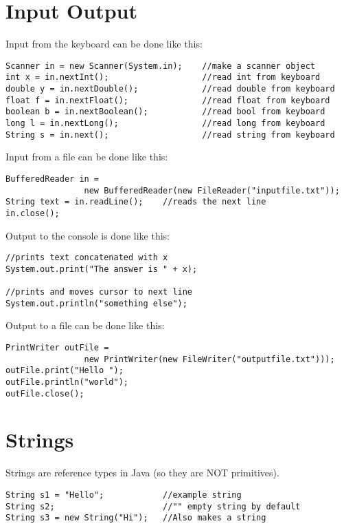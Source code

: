 \documentclass[paper=a4, fontsize=11pt, parskip=full]{scrartcl} %
\numberwithin{equation}{section} %
\numberwithin{figure}{section} %
\numberwithin{table}{section} %
\begin{document}
\section{Input Output}

Input from the keyboard can be done like this:

\begin{lstlisting}
Scanner in = new Scanner(System.in); 	//make a scanner object
int x = in.nextInt();					//read int from keyboard
double y = in.nextDouble();				//read double from keyboard
float f = in.nextFloat();				//read float from keyboard
boolean b = in.nextBoolean();			//read bool from keyboard
long l = in.nextLong();					//read long from keyboard
String s = in.next();					//read string from keyboard
\end{lstlisting}

Input from a file can be done like this:

\begin{lstlisting}
BufferedReader in =
				new BufferedReader(new FileReader("inputfile.txt")); 
String text = in.readLine(); 	//reads the next line
in.close();
\end{lstlisting}

Output to the console is done like this:

\begin{lstlisting}
//prints text concatenated with x
System.out.print("The answer is " + x);

//prints and moves cursor to next line
System.out.println("something else");
\end{lstlisting}

Output to a file can be done like this:

\begin{lstlisting}
PrintWriter outFile =
				new PrintWriter(new FileWriter("outputfile.txt"))); 
outFile.print("Hello "); 
outFile.println("world"); 
outFile.close();
\end{lstlisting}


\section{Strings}

Strings are reference types in Java (so they are NOT primitives).

\begin{lstlisting}
String s1 = "Hello";			//example string
String s2;						//"" empty string by default
String s3 = new String("Hi");	//Also makes a string
\end{lstlisting}
\end{document}

